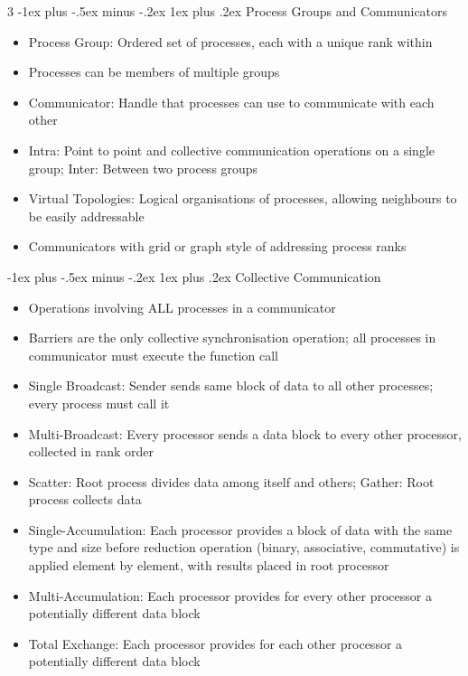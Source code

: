 \documentclass[10pt, landscape]{article}
\makeatletter
\renewcommand{\subsection}{\@startsection{subsection}{3}{0mm}%
                                {-1ex plus -.5ex minus -.2ex}%
                                {1ex plus .2ex}%
                                {\normalfont\small\bfseries}}%
\makeatother
\begin{document}
\begin{multicols*}{3}
\subsection{Process Groups and Communicators}
\begin{itemize}
    \item Process Group: Ordered set of processes, each with a unique rank within
    \item Processes can be members of multiple groups
    \item Communicator: Handle that processes can use to communicate with each other
    \item Intra: Point to point and collective communication operations on a single group; Inter: Between two process groups
    \item Virtual Topologies: Logical organisations of processes, allowing neighbours to be easily addressable
    \item Communicators with grid or graph  style of addressing process ranks
\end{itemize}

\subsection{Collective Communication}
\begin{itemize}
    \item Operations involving ALL processes in a communicator
    \item Barriers are the only collective synchronisation operation; all processes in communicator must execute the function call
    \item Single Broadcast:  Sender sends same block of data to all other processes; every process must call it
    \item Multi-Broadcast: Every processor sends a data block to every other processor, collected in rank order
    \item Scatter: Root process divides data among itself and others; Gather: Root process collects data
    \item Single-Accumulation: Each processor provides a block of data with the same type and size before reduction operation (binary, associative, commutative) is applied element by element, with results placed in root processor
    \item Multi-Accumulation: Each processor provides for every other processor a potentially different data block
    \item Total Exchange: Each processor provides for each other processor a potentially different data block
\end{itemize}


\end{multicols*}
\end{document}
